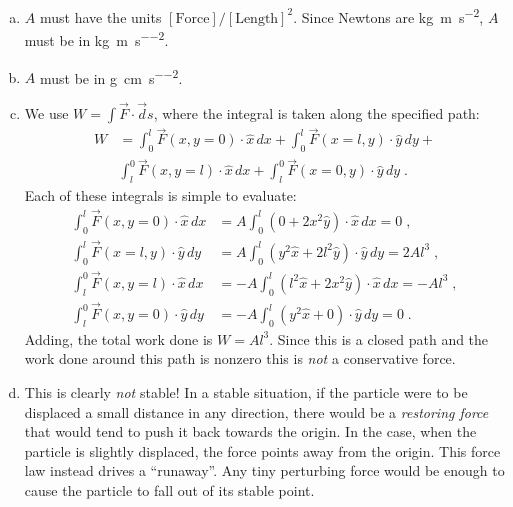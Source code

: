 \documentclass{esg8022pset}
\begin{document}
\begin{solution}
  \begin{enumerate}[(a)]
    \item $A$ must have the units $[\text{Force}]/[\text{Length}]^2$.  Since
      Newtons are \si{\kilo\gram\meter\per\second\squared}, $A$ must be in \si{\kilo\gram\per\meter\per\second\squared}.
    \item $A$ must be in \si{\gram\per\centi\meter\per\second\squared}.
    \item We use $W = \int {\vec F}\cdot{\vec ds}$, where the
      integral is taken along the specified path:
      \begin{align*} 
        W & =
          \int_0^l {\vec F}(x,y=0)\cdot{\hat x\,dx} +
          \int_0^l {\vec F}(x = l,y)\cdot{\hat y\,dy} +\\
          & \int_l^0 {\vec F}(x,y=l)\cdot{\hat x\,dx} +
          \int_l^0 {\vec F}(x = 0,y)\cdot{\hat y\,dy}\;.
      \end{align*}
      Each of these integrals is simple to evaluate:
      \begin{align*}
        \int_0^l {\vec F}(x,y = 0)\cdot{\hat x\,dx} & =
          A \int_0^l (0 + 2x^2\hat y)\cdot\hat x\,dx = 0\;,\\
        \int_0^l {\vec F}(x = l,y)\cdot{\hat y\,dy} & =
          A \int_0^l (y^2\hat x + 2l^2\hat y)\cdot\hat y\,dy = 2 A l^3\;,\\
        \int_l^0 {\vec F}(x,y = l)\cdot{\hat x\,dx} & =
          -A \int_0^l (l^2\hat x + 2x^2\hat y)\cdot\hat x\,dx = -A l^3\;,\\
        \int_l^0 {\vec F}(x,y = 0)\cdot{\hat y\,dy} & =
          -A \int_0^l (y^2\hat x + 0)\cdot\hat y\,dy = 0\;.
      \end{align*}
      Adding, the total work done is $W = Al^3$.  Since this is a closed
      path and the work done around this path is nonzero this is \emph{not}
      a conservative force.
    \item This is clearly \emph{not} stable!  In a stable situation,
      if the particle were to be displaced a small distance in any
      direction, there would be a \emph{restoring force} that would tend to
      push it back towards the origin.  In the case, when the particle is
      slightly displaced, the force points away from the origin.  This force
      law instead drives a ``runaway''.  Any tiny perturbing force would be
      enough to cause the particle to fall out of its stable point.
  \end{enumerate}
\end{solution}
\end{document}
